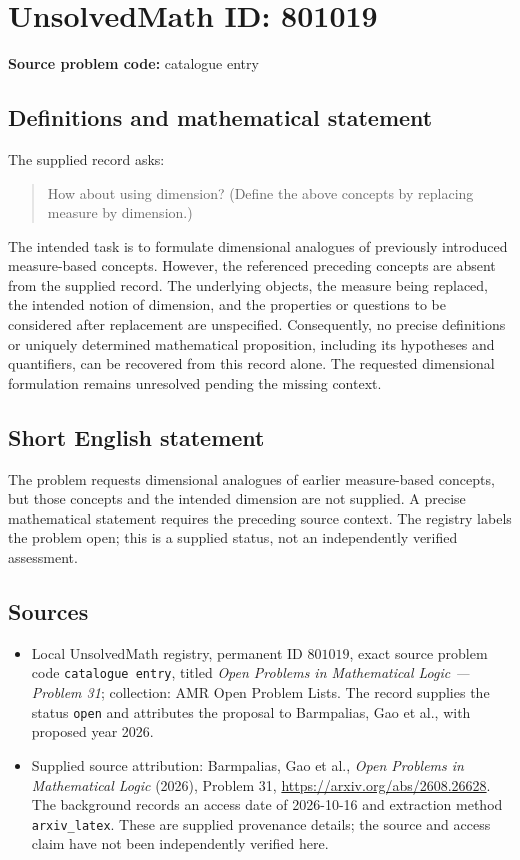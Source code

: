 \documentclass[11pt]{article}
\begin{document}
\section*{UnsolvedMath ID: 801019}
\textbf{Source problem code:} catalogue entry
\subsection{Definitions and mathematical statement}
The supplied record asks:
\begin{quote}
How about using dimension? (Define the above concepts by replacing measure by dimension.)
\end{quote}
The intended task is to formulate dimensional analogues of previously introduced measure-based concepts. However, the referenced preceding concepts are absent from the supplied record. The underlying objects, the measure being replaced, the intended notion of dimension, and the properties or questions to be considered after replacement are unspecified. Consequently, no precise definitions or uniquely determined mathematical proposition, including its hypotheses and quantifiers, can be recovered from this record alone. The requested dimensional formulation remains unresolved pending the missing context.
\subsection{Short English statement}
The problem requests dimensional analogues of earlier measure-based concepts, but those concepts and the intended dimension are not supplied. A precise mathematical statement requires the preceding source context. The registry labels the problem open; this is a supplied status, not an independently verified assessment.
\subsection{Sources}
\begin{itemize}
\item Local UnsolvedMath registry, permanent ID \(801019\), exact source problem code \texttt{catalogue entry}, titled \emph{Open Problems in Mathematical Logic --- Problem 31}; collection: AMR Open Problem Lists. The record supplies the status \texttt{open} and attributes the proposal to Barmpalias, Gao et al., with proposed year 2026.
\item Supplied source attribution: Barmpalias, Gao et al., \emph{Open Problems in Mathematical Logic} (2026), Problem 31, \url{https://arxiv.org/abs/2608.26628}. The background records an access date of 2026-10-16 and extraction method \texttt{arxiv\_latex}. These are supplied provenance details; the source and access claim have not been independently verified here.
\end{itemize}
\end{document}
